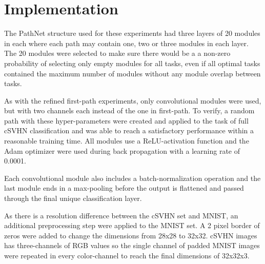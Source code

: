 


 
\section{Implementation}\label{Search-implementation}
The PathNet structure used for these experiments had three layers of 20 modules in each where each path may contain one, two or three modules in each layer. The 20 modules were selected to make sure there would be a a non-zero probability of selecting only empty modules for all tasks, even if all optimal tasks contained the maximum number of modules without any module overlap between tasks.

As with the refined first-path experiments, only convolutional modules were used, but with two channels each instead of the one in first-path. To verify, a random path with these hyper-parameters were created and applied to the task of full cSVHN classification and was able to reach a satisfactory performance within a reasonable training time. All modules use a ReLU-activation function and the Adam optimizer were used during back propagation with a learning rate of 0.0001. 

Each convolutional module also includes a batch-normalization operation and the last module ends in a max-pooling before the output is flattened and passed through the final unique classification layer. 

As there is a resolution difference between the cSVHN set and MNIST, an additional preprocessing step were applied to the MNIST set. A 2 pixel border of zeros were added to change the dimensions from 28x28 to 32x32. cSVHN images has three-channels of RGB values so the single channel of padded MNIST images were repeated in every color-channel to reach the final dimensions of 32x32x3.  

